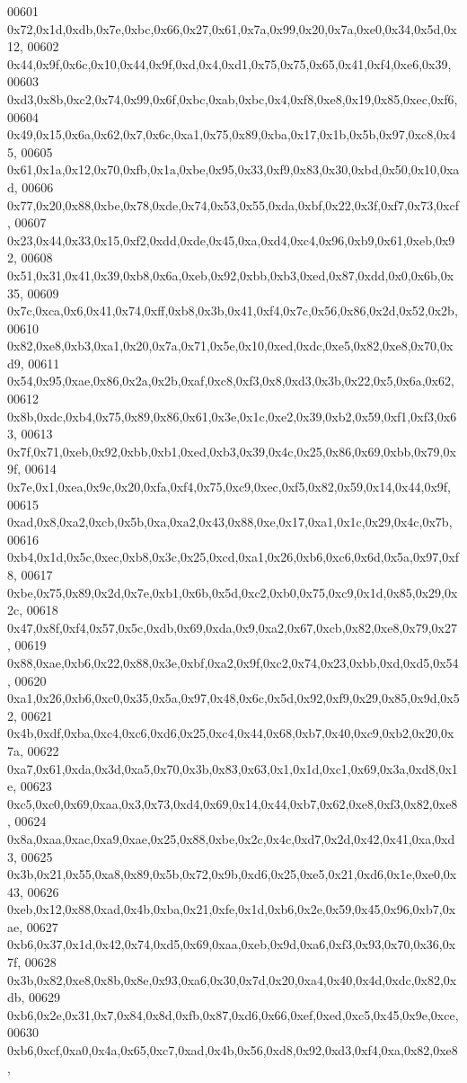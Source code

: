 \begin{DoxyCode}
00601   0x72,0x1d,0xdb,0x7e,0xbc,0x66,0x27,0x61,0x7a,0x99,0x20,0x7a,0xe0,0x34,0x5d,0x12,
00602   0x44,0x9f,0x6c,0x10,0x44,0x9f,0xd,0x4,0xd1,0x75,0x75,0x65,0x41,0xf4,0xe6,0x39,
00603   0xd3,0x8b,0xc2,0x74,0x99,0x6f,0xbc,0xab,0xbc,0x4,0xf8,0xe8,0x19,0x85,0xec,0xf6,
00604   0x49,0x15,0x6a,0x62,0x7,0x6c,0xa1,0x75,0x89,0xba,0x17,0x1b,0x5b,0x97,0xc8,0x45,
00605   0x61,0x1a,0x12,0x70,0xfb,0x1a,0xbe,0x95,0x33,0xf9,0x83,0x30,0xbd,0x50,0x10,0xad,
00606   0x77,0x20,0x88,0xbe,0x78,0xde,0x74,0x53,0x55,0xda,0xbf,0x22,0x3f,0xf7,0x73,0xcf,
00607   0x23,0x44,0x33,0x15,0xf2,0xdd,0xde,0x45,0xa,0xd4,0xc4,0x96,0xb9,0x61,0xeb,0x92,
00608   0x51,0x31,0x41,0x39,0xb8,0x6a,0xeb,0x92,0xbb,0xb3,0xed,0x87,0xdd,0x0,0x6b,0x35,
00609   0x7c,0xca,0x6,0x41,0x74,0xff,0xb8,0x3b,0x41,0xf4,0x7c,0x56,0x86,0x2d,0x52,0x2b,
00610   0x82,0xe8,0xb3,0xa1,0x20,0x7a,0x71,0x5e,0x10,0xed,0xdc,0xe5,0x82,0xe8,0x70,0xd9,
00611   0x54,0x95,0xae,0x86,0x2a,0x2b,0xaf,0xc8,0xf3,0x8,0xd3,0x3b,0x22,0x5,0x6a,0x62,
00612   0x8b,0xdc,0xb4,0x75,0x89,0x86,0x61,0x3e,0x1c,0xe2,0x39,0xb2,0x59,0xf1,0xf3,0x63,
00613   0x7f,0x71,0xeb,0x92,0xbb,0xb1,0xed,0xb3,0x39,0x4c,0x25,0x86,0x69,0xbb,0x79,0x9f,
00614   0x7e,0x1,0xea,0x9c,0x20,0xfa,0xf4,0x75,0xc9,0xec,0xf5,0x82,0x59,0x14,0x44,0x9f,
00615   0xad,0x8,0xa2,0xcb,0x5b,0xa,0xa2,0x43,0x88,0xe,0x17,0xa1,0x1c,0x29,0x4c,0x7b,
00616   0xb4,0x1d,0x5c,0xec,0xb8,0x3c,0x25,0xcd,0xa1,0x26,0xb6,0xc6,0x6d,0x5a,0x97,0xf8,
00617   0xbe,0x75,0x89,0x2d,0x7e,0xb1,0x6b,0x5d,0xc2,0xb0,0x75,0xc9,0x1d,0x85,0x29,0x2c,
00618   0x47,0x8f,0xf4,0x57,0x5c,0xdb,0x69,0xda,0x9,0xa2,0x67,0xcb,0x82,0xe8,0x79,0x27,
00619   0x88,0xae,0xb6,0x22,0x88,0x3e,0xbf,0xa2,0x9f,0xc2,0x74,0x23,0xbb,0xd,0xd5,0x54,
00620   0xa1,0x26,0xb6,0xc0,0x35,0x5a,0x97,0x48,0x6c,0x5d,0x92,0xf9,0x29,0x85,0x9d,0x52,
00621   0x4b,0xdf,0xba,0xc4,0xc6,0xd6,0x25,0xc4,0x44,0x68,0xb7,0x40,0xc9,0xb2,0x20,0x7a,
00622   0xa7,0x61,0xda,0x3d,0xa5,0x70,0x3b,0x83,0x63,0x1,0x1d,0xc1,0x69,0x3a,0xd8,0x1e,
00623   0xc5,0xc0,0x69,0xaa,0x3,0x73,0xd4,0x69,0x14,0x44,0xb7,0x62,0xe8,0xf3,0x82,0xe8,
00624   0x8a,0xaa,0xac,0xa9,0xae,0x25,0x88,0xbe,0x2c,0x4c,0xd7,0x2d,0x42,0x41,0xa,0xd3,
00625   0x3b,0x21,0x55,0xa8,0x89,0x5b,0x72,0x9b,0xd6,0x25,0xe5,0x21,0xd6,0x1e,0xe0,0x43,
00626   0xeb,0x12,0x88,0xad,0x4b,0xba,0x21,0xfe,0x1d,0xb6,0x2e,0x59,0x45,0x96,0xb7,0xae,
00627   0xb6,0x37,0x1d,0x42,0x74,0xd5,0x69,0xaa,0xeb,0x9d,0xa6,0xf3,0x93,0x70,0x36,0x7f,
00628   0x3b,0x82,0xe8,0x8b,0x8e,0x93,0xa6,0x30,0x7d,0x20,0xa4,0x40,0x4d,0xdc,0x82,0xdb,
00629   0xb6,0x2e,0x31,0x7,0x84,0x8d,0xfb,0x87,0xd6,0x66,0xef,0xed,0xc5,0x45,0x9e,0xce,
00630   0xb6,0xcf,0xa0,0x4a,0x65,0xc7,0xad,0x4b,0x56,0xd8,0x92,0xd3,0xf4,0xa,0x82,0xe8,

\end{DoxyCode}
